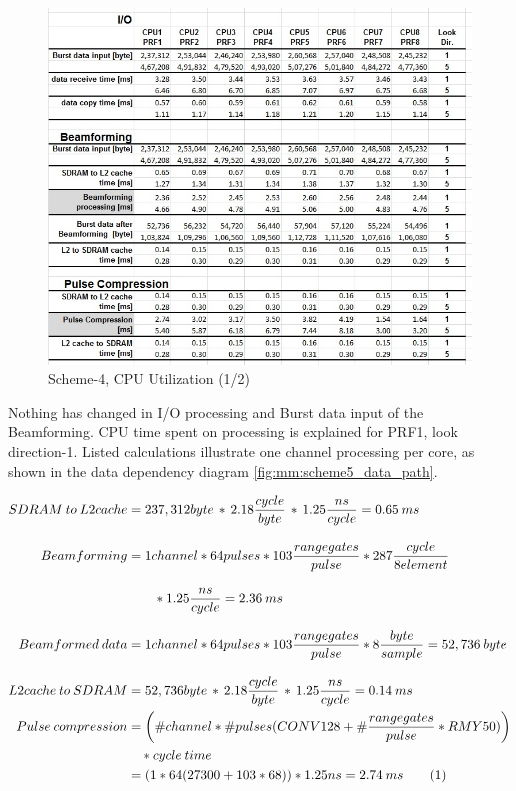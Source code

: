 \begin{figure}[h!]
	\centering
	\includegraphics[width=160mm]{figures/scheme5_cpu_util1}
	\caption{Scheme-4, CPU Utilization (1/2)}
	\label{fig:mm:scheme5_cpu_util1}
\end{figure}
Nothing has changed in I/O processing and Burst data input of the Beamforming. CPU time spent on processing is explained for PRF1, look direction-1. Listed calculations illustrate one channel processing per core, as shown in the data dependency diagram \ref{fig:mm:scheme5_data_path}.

\begin{align*}
\label{aa:scheme5:equ1}
	SDRAM \: to \: L2cache &= 237,312 byte \, * \, 2.18\frac{cycle}{byte} \, * \, 1.25\frac{ns}{cycle} = 0.65 \: ms \\[0.3cm]
	Beamforming &= 1channel * 64pulses * 103 \frac{range gates}{pulse} * 287\frac{cycle}{8 element} \\[0.3cm] 
	&\qquad * 1.25\frac{ns}{cycle} = 2.36 \: ms\\[0.3cm]
	Beamformed \: data &= 1channel * 64pulses * 103 \frac{range gates}{pulse} *8\frac{byte}{sample} = 52,736 \: byte \\[0.3cm]
	L2cache \: to \: SDRAM &= 52,736 byte \, * \, 2.18\frac{cycle}{byte} \, * \, 1.25\frac{ns}{cycle} = 0.14 \: ms \\
	Pulse \: compression &= \bigg(\#channel * \#pulses (CONV128 +  \# \frac{range gates}{pulse} * RMY50)\bigg) \\
			& \quad * cycle \: time \\
			&= (1 * 64 (27300 + 103 * 68)) * 1.25ns = 2.74 \: ms \stepcounter{equation}\tag{\theequation} 
\end{align*}

